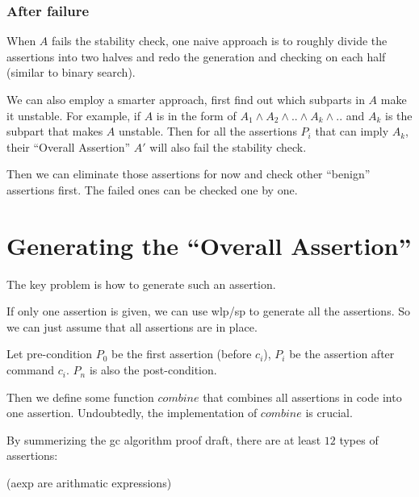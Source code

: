 \documentclass[12pt, fleqn]{article}
\begin{document}

\subsubsection{After failure}

When $A$ fails the stability check, one naive approach is to roughly
divide the assertions into two halves and redo the generation and
checking on each half (similar to binary search).

We can also employ a smarter approach, first find out which subparts
in $A$ make it unstable. For example, if $A$ is in the form of $A_1
\land A_2 \land .. \land A_k \land ..$ and $A_k$ is the subpart that
makes $A$ unstable. Then for all the assertions $P_i$ that can imply
$A_k$, their ``Overall Assertion'' $A'$ will also fail the stability
check.

Then we can eliminate those assertions for now and check other
``benign'' assertions first. The failed ones can be checked one by
one.


\section{Generating the ``Overall Assertion''}

The key problem is how to generate such an assertion.

\bigskip

If only one assertion is given, we can use wlp/sp to generate all the
assertions. So we can just assume that all assertions are in place.

Let pre-condition $P_0$ be the first assertion (before $c_i$), $P_i$
be the assertion after command $c_i$. $P_n$ is also the
post-condition.

Then we define some function $combine$ that combines all assertions in
code into one assertion. Undoubtedly, the implementation of $combine$
is crucial.

\bigskip

By summerizing the gc algorithm proof draft, there are at least $12$
types of assertions:

(aexp are arithmatic expressions)
\end{document}

